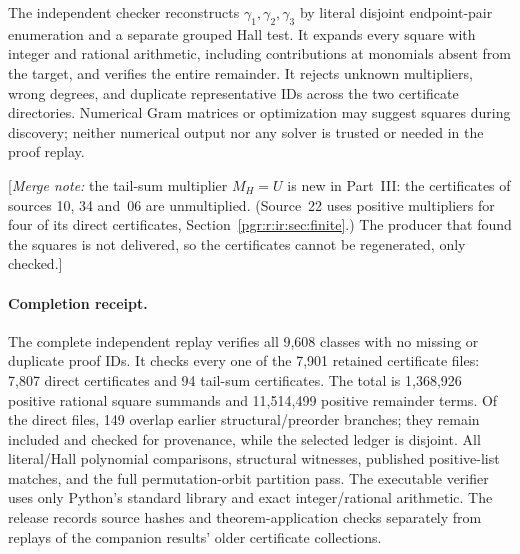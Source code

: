 \documentclass[11pt]{article}
\numberwithin{equation}{section}
\theoremstyle{definition}\newtheorem{definition}[theorem]{Definition}\newtheorem{remark}[theorem]{Remark}
\newcommand{\mnote}[1]{[\textit{Merge note:} #1]}
\begin{document}
The independent checker reconstructs $\gamma_1,\gamma_2,\gamma_3$ by literal disjoint endpoint-pair enumeration and a separate grouped Hall test. It expands every square with integer and rational arithmetic, including contributions at monomials absent from the target, and verifies the entire remainder. It rejects unknown multipliers, wrong degrees, and duplicate representative IDs across the two certificate directories. Numerical Gram matrices or optimization may suggest squares during discovery; neither numerical output nor any solver is trusted or needed in the proof replay.

\mnote{the tail-sum multiplier $M_H=U$ is new in Part~III: the
certificates of sources 10, 34 and~06 are unmultiplied. (Source~22 uses
positive multipliers for four of its direct certificates,
Section~\ref{pgr:r:ir:sec:finite}.) The producer that
found the squares is not delivered, so the certificates cannot be
regenerated, only checked.}

\paragraph{Completion receipt.}
The complete independent replay verifies all 9,608 classes with no missing or duplicate proof IDs. It checks every one of the 7,901 retained certificate files: 7,807 direct certificates and 94 tail-sum certificates. The total is 1,368,926 positive rational square summands and 11,514,499 positive remainder terms. Of the direct files, 149 overlap earlier structural/preorder branches; they remain included and checked for provenance, while the selected ledger is disjoint. All literal/Hall polynomial comparisons, structural witnesses, published positive-list matches, and the full permutation-orbit partition pass. The executable verifier uses only Python's standard library and exact integer/rational arithmetic. The release records source hashes and theorem-application checks separately from replays of the companion results' older certificate collections.
\end{document}
